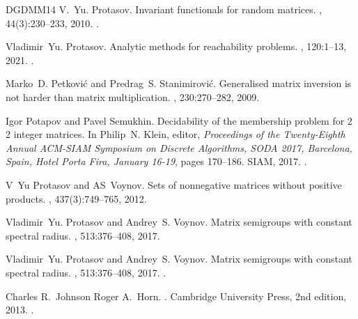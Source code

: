 \documentclass[11pt,a4paper]{amsart}
\theoremstyle{plain}
\theoremstyle{definition}
\theoremstyle{defC}
\theoremstyle{thmC}
\theoremstyle{plain}
\numberwithin{equation}{section}
\begin{document}
\begin{thebibliography}{DGDMM14}
V.~Yu. Protasov.
\newblock Invariant functionals for random matrices.
, 44(3):230--233, 2010.
\newblock \href {https://doi.org/10.1007/s10688-010-0031-0}
  {}.

Vladimir~Yu. Protasov.
\newblock Analytic methods for reachability problems.
, 120:1--13, 2021.
\newblock \href {https://doi.org/10.1016/J.JCSS.2021.02.007}
  {}.

Marko~D. Petković and Predrag~S. Stanimirović.
\newblock Generalised matrix inversion is not harder than matrix
  multiplication.
, 230:270--282,
  2009.

Igor Potapov and Pavel Semukhin.
\newblock Decidability of the membership problem for 2 {\texttimes} 2 integer
  matrices.
\newblock In Philip~N. Klein, editor, {\em Proceedings of the Twenty-Eighth
  Annual {ACM-SIAM} Symposium on Discrete Algorithms, {SODA} 2017, Barcelona,
  Spain, Hotel Porta Fira, January 16-19}, pages 170--186. {SIAM}, 2017.
\newblock \href {https://doi.org/10.1137/1.9781611974782.12}
  {}.

V~Yu Protasov and AS~Voynov.
\newblock Sets of nonnegative matrices without positive products.
, 437(3):749--765, 2012.

Vladimir~Yu. Protasov and Andrey~S. Voynov.
\newblock Matrix semigroups with constant spectral radius.
, 513:376--408, 2017.

Vladimir~Yu. Protasov and Andrey~S. Voynov.
\newblock Matrix semigroups with constant spectral radius.
, 513:376--408, 2017.
\newblock \href {https://doi.org/10.1016/j.laa.2016.10.013}
  {}.

Charles R.~Johnson Roger A.~Horn.
.
\newblock Cambridge University Press, 2nd edition, 2013.
\newblock \href {https://doi.org/10.1017/CBO9780511810817}
  {}.


\end{thebibliography}
\end{document}
